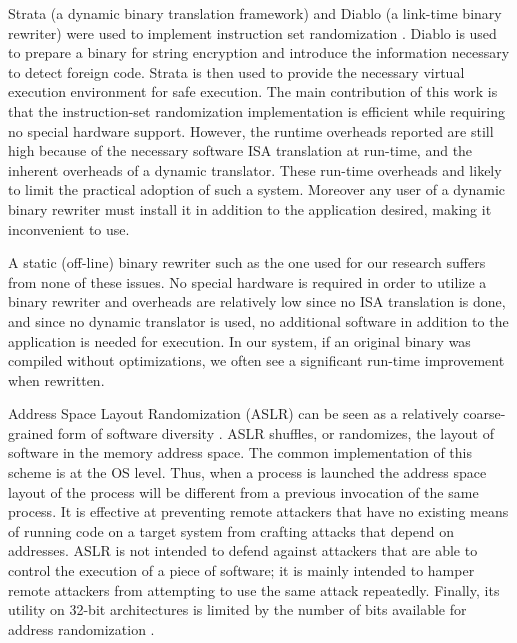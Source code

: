 
Strata (a dynamic binary translation framework) and Diablo (a
link-time binary rewriter) were used to implement instruction set
randomization \cite{strata}. Diablo is used to prepare a binary for
string encryption and introduce the information necessary to detect
foreign code. Strata is then used to provide the necessary virtual
execution environment for safe execution. The main contribution of
this work is that the instruction-set randomization implementation is
efficient while requiring no special hardware support. However, the
runtime overheads reported are still high because of the necessary
software ISA translation at run-time, and the inherent overheads of a
dynamic translator. These run-time overheads and likely to limit the
practical adoption of such a system. Moreover any user of a dynamic binary rewriter must install it in addition to the application desired, making it inconvenient to use.

A static (off-line) binary rewriter such as the one used for our
research suffers from none of these issues. No special hardware is
required in order to utilize a binary rewriter and overheads are
relatively low since no ISA translation is done, and since no dynamic
translator is used, no additional software in addition to the application is needed for execution. In our system, if an original binary was compiled
without optimizations, we often see a significant run-time improvement
when rewritten.

 Address Space Layout
Randomization (ASLR) can be seen as a relatively coarse-grained form
of software diversity \cite{aslr}. ASLR shuffles, or randomizes, the
layout of software in the memory address space. The common
implementation of this scheme is at the OS level. Thus, when a process
is launched the address space layout of the process will be different
from a previous invocation of the same process. It is effective at
preventing remote attackers that have no existing means of running
code on a target system from crafting attacks that depend on
addresses. ASLR is not intended to defend against attackers that are
able to control the execution of a piece of software; it is mainly
intended to hamper remote attackers from attempting to use the same
attack repeatedly. Finally, its utility on 32-bit architectures is
limited by the number of bits available for address randomization
\cite{aslr32}.

